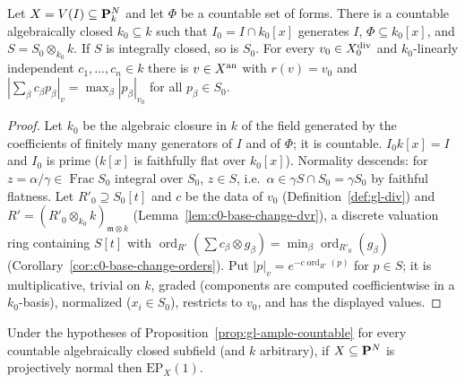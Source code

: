 \begin{lemma}\label{lem:gl-field-descent}
\leanok
{}
Let $X=V(I)\subseteq\mathbf{P}^N_k$ and let $\Phi$ be a countable set of forms. There is a countable algebraically closed $k_0\subseteq k$ such that
$I_0=I\cap k_0[x]$ generates $I$, $\Phi\subseteq k_0[x]$, and $S=S_0\otimes_{k_0}k$. If $S$ is integrally closed, so is $S_0$. For every
$v_0\in X_0^{\mathrm{div}}$ and $k_0$-linearly independent $c_1,\dots,c_n\in k$ there is $v\in X^{\mathrm{an}}$ with $r(v)=v_0$ and
$|\sum_\beta c_\beta p_\beta|_v=\max_\beta|p_\beta|_{v_0}$ for all $p_\beta\in S_0$.
\end{lemma}

\begin{proof}
Let $k_0$ be the algebraic closure in $k$ of the field generated by the coefficients of finitely many generators of $I$ and of $\Phi$; it is countable. $I_0k[x]=I$
and $I_0$ is prime ($k[x]$ is faithfully flat over $k_0[x]$). Normality descends: for $z=\alpha/\gamma\in\operatorname{Frac}S_0$ integral over $S_0$, $z\in S$, i.e.\
$\alpha\in\gamma S\cap S_0=\gamma S_0$ by faithful flatness. Let $R'_0\supseteq S_0[t]$ and $c$ be the data of $v_0$ (Definition~\ref{def:gl-div}) and
$R'=(R'_0\otimes_{k_0}k)_{\mathfrak m\otimes k}$ (Lemma~\ref{lem:c0-base-change-dvr}), a discrete valuation ring containing $S[t]$ with
$\operatorname{ord}_{R'}(\sum c_\beta\otimes g_\beta)=\min_\beta\operatorname{ord}_{R'_0}(g_\beta)$ (Corollary~\ref{cor:c0-base-change-orders}). Put
$|p|_v=e^{-c\operatorname{ord}_{R'}(p)}$ for $p\in S$; it is multiplicative, trivial on $k$, graded (components are computed coefficientwise in a $k_0$-basis),
normalized ($x_i\in S_0$), restricts to $v_0$, and has the displayed values.
\end{proof}

\begin{proposition}[Ample envelopes; Step~2 {\cite[Theorem~6.1]{FHX}}]\label{prop:gl-ample-rational}
\leanok
{}
Under the hypotheses of Proposition~\ref{prop:gl-ample-countable} for every countable algebraically closed subfield (and $k$ arbitrary), if $X\subseteq\mathbf{P}^N$ is
projectively normal then $\mathrm{EP}_X(1)$.
\end{proposition}

